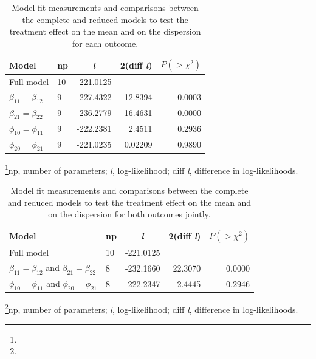 \documentclass[useAMS,referee]{biom}
\begin{document}
\begin{table}[h]
\centering
\caption{Model fit measurements and comparisons between the complete and reduced models to test the treatment effect on the mean and on the dispersion for each outcome.}
\begin{tabular}{p{6cm}p{1cm}crr} \hline
Model & np & \textit{l} & 2(diff \textit{l}) & $P(> \chi^2)$ \\ 		\hline
Full model & 10 & -221.0125 && \\
\hdashline
\qquad	$\beta_{11} = \beta_{12}$   & 9 &-227.4322 & 12.8394& 0.0003\\
\qquad	$\beta_{21} = \beta_{22}$   & 9 &-236.2779 & 16.4631& 0.0000\\

\qquad $\phi_{10} = \phi_{11}$  & 9 & -222.2381 & 2.4511& 0.2936\\

\qquad  $\phi_{20} = \phi_{21}$  & 9 &-221.0235 & 0.02209& 0.9890\\


\hline
\end{tabular}

\footnote{}{np, number of parameters; \textit{l}, log-likelihood; diff \textit{l}, difference in log-likelihoods.}	

\label{table2}
\end{table}


\begin{table}[!h]
\centering
\caption{Model fit measurements and comparisons between the complete and reduced models to test the treatment effect on the mean and on the dispersion for both outcomes jointly.}
\begin{tabular}{p{6cm}p{1cm}crr} \hline
Model & np & \textit{l} & 2(diff \textit{l}) & $P(> \chi^2)$ \\ 		\hline
Full model & 10 & -221.0125 && \\
\hdashline
\qquad	$\beta_{11} = \beta_{12}$ and $\beta_{21} = \beta_{22}$   & 8 &-232.1660 & 22.3070& 0.0000\\

\qquad $\phi_{10} = \phi_{11}$ and $\phi_{20} = \phi_{21}$   & 8 & -222.2347 & 2.4445& 0.2946\\


\hline
\end{tabular}

\footnote{}{np, number of parameters; \textit{l}, log-likelihood; diff \textit{l}, difference in log-likelihoods.}	

\label{table5.3}
\end{table}
\end{document}
